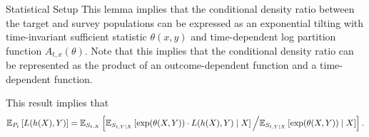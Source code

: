 \documentclass{article}
\theoremstyle{definition}
\theoremstyle{plain}
\theoremstyle{remark}
\begin{document}
\begin{section}{Statistical Setup}
This lemma implies that the conditional density ratio between the target and survey populations can be expressed as an exponential tilting with time-invariant sufficient statistic $\theta(x, y)$ and time-dependent log partition function $A_{t, x}(\theta)$. Note that this implies that the conditional density ratio can be represented as the product of an outcome-dependent function and a time-dependent function.







This result implies that 
\[ \EE[P_{t}]{L(h(X), Y)} = \EE[S_{t, X}]{\EE[S_{t, Y \mid X}]{\exp(\theta(X, Y)) \cdot L(h(X), Y) \mid X} \Big/ \EE[S_{t, Y \mid X}]{\exp(\theta(X, Y)) \mid X}}.\]

\end{section}
\end{document}
